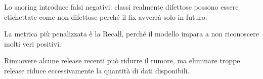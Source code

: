 \begin{notaesame}
Lo snoring introduce falsi negativi: classi realmente difettose possono essere etichettate come non difettose perché il fix avverrà solo in futuro.
\end{notaesame}

\begin{notaesame}
La metrica più penalizzata è la Recall, perché il modello impara a non riconoscere molti veri positivi.
\end{notaesame}

\begin{notaesame}
Rimuovere alcune release recenti può ridurre il rumore, ma eliminare troppe release riduce eccessivamente la quantità di dati disponibili.
\end{notaesame}